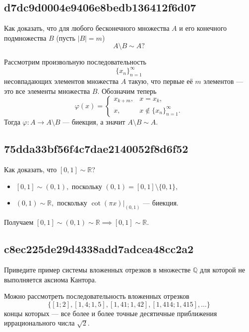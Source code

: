 \documentclass[11pt, a5paper]{article}
\newenvironment{note}[1]{\goodbreak\par\subsection{\hfill \color{lightgray}\tiny #1}}{}
\newenvironment{cloze}[2][\ldots]{\begin{leftbar}}{\end{leftbar}}
\begin{document}
    \begin{note}{d7dc9d0004e9406e8bedb136412f6d07}
        Как доказать, что для любого бесконечного множества \( A \) и его конечного
        подмножества \( B \) (пусть \( |B| = m \)) \[
            A \setminus B \sim  A?
        \]

        \begin{cloze}{1}
            Рассмотрим произвольную последовательность \[
                \{ x_n \}_{n = 1} ^{\infty }
            \] несовпадающих элементов множества \( A \) такую, что первые её \( m \)
            элементов --- это все элементы множества \( B. \) Обозначим теперь \[
                \varphi(x) = \begin{cases}
                    x_{k + m}, & x = x_k, \\
                    x, & x \not\in \{ x_n \}_{n = 1}^{\infty }.
                \end{cases}
            \] Тогда \( \varphi : A \to A \setminus B \) --- биекция, а значит
            \( A \setminus B \sim A. \)
        \end{cloze}
    \end{note}

    \begin{note}{75dda33bf56f4c7dae2140052f8d6f52}
        Как доказать, что \( [0, 1] \sim \mathbb R  \)?

        \begin{cloze}{1}
            \begin{itemize}
                \item \( [0, 1] \sim (0, 1),  \) поскольку \( (0, 1) = [0, 1]
                    \setminus \{ 0, 1 \},  \)
                \item \( (0, 1) \sim \mathbb R, \)  поскольку \( \cot (\pi
                    x)|_{(0, 1)} \) --- биекция.
            \end{itemize}
            Получаем \( [0, 1] \sim (0, 1) \sim \mathbb R \implies [0, 1] \sim
            \mathbb R. \)
        \end{cloze}
    \end{note}

    \begin{note}{c8ec225de29d4338add7adcea48cc2a2}
        Приведите пример системы вложенных отрезков в множестве \( \mathbb Q  \)
        для которой не выполняется аксиома Кантора.

        \begin{cloze}{1}
            Можно рассмотреть последовательность вложенных отрезков \[
                \{ [1;2], [1{,}4;1{,}5], [1{,}41;1{,}42],
                    [1{,}414;1{,}415],\ldots \}
            \] концы которых --- все более и более точные десятичные приближения
            иррационального числа \( \sqrt{2}. \)
        \end{cloze}
    \end{note}
\end{document}

